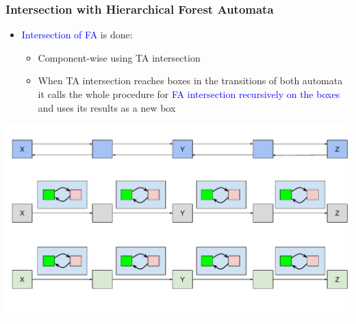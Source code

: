 \documentclass{beamer}
\newcommand{\hlbl}[1]{\textcolor{blue}{#1}}
\begin{document}
\begin{frame}
\frametitle{Intersection with Hierarchical Forest Automata}

  	\begin{itemize}
	\item \hlbl{Intersection of FA} is done:
		  	\begin{itemize}
				\item Component-wise using TA intersection
				\item When TA intersection reaches boxes in the transitions of both automata it calls the whole
					procedure for \hlbl{FA intersection recursively on the boxes} and uses its results as a new box
			\end{itemize}
	\end{itemize}
	\begin{center}
		\includegraphics[scale=0.4]{ex/is.pdf}
	\end{center}

\end{frame}
\end{document}
